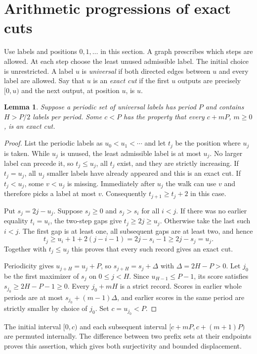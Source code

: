 \documentclass[11pt]{article}
\newtheorem{lemma}[theorem]{Lemma}
\begin{document}
\clearpage
\section{Arithmetic progressions of exact cuts}
Use labels and positions $0,1,\ldots$ in this section. A graph prescribes which steps are allowed. At each step choose the least unused admissible label. The initial choice is unrestricted. A label $u$ is \emph{universal} if both directed edges between $u$ and every label are allowed. Say that $u$ is an \emph{exact cut} if the first $u$ outputs are precisely $[0,u)$ and the next output, at position $u$, is $u$.
\begin{lemma}\label{period}
Suppose a periodic set of universal labels has period $P$ and contains $H>P/2$ labels per period. Some $c<P$ has the property that every $c+mP$, $m\ge0$, is an exact cut.
\end{lemma}
\begin{proof}
List the periodic labels as $u_0<u_1<\cdots$ and let $t_j$ be the position where $u_j$ is taken. While $u_j$ is unused, the least admissible label is at most $u_j$. No larger label can precede it, so $t_j\le u_j$, all $t_j$ exist, and they are strictly increasing. If $t_j=u_j$, all $u_j$ smaller labels have already appeared and this is an exact cut. If $t_j<u_j$, some $v<u_j$ is missing. Immediately after $u_j$ the walk can use $v$ and therefore picks a label at most $v$. Consequently $t_{j+1}\ge t_j+2$ in this case.

Put $s_j=2j-u_j$. Suppose $s_j\ge0$ and $s_j>s_i$ for all $i<j$. If there was no earlier equality $t_i=u_i$, the two-step gaps give $t_j\ge2j\ge u_j$. Otherwise take the last such $i<j$. The first gap is at least one, all subsequent gaps are at least two, and hence
\[
 t_j\ge u_i+1+2(j-i-1)=2j-s_i-1\ge2j-s_j=u_j.
\]
Together with $t_j\le u_j$ this proves that every such record gives an exact cut.

Periodicity gives $u_{j+H}=u_j+P$, so $s_{j+H}=s_j+\Delta$ with $\Delta=2H-P>0$. Let $j_0$ be the first maximizer of $s_j$ on $0\le j<H$. Since $u_{H-1}\le P-1$, its score satisfies $s_{j_0}\ge2H-P-1\ge0$. Every $j_0+mH$ is a strict record. Scores in earlier whole periods are at most $s_{j_0}+(m-1)\Delta$, and earlier scores in the same period are strictly smaller by choice of $j_0$. Set $c=u_{j_0}<P$.
\end{proof}
The initial interval $[0,c)$ and each subsequent interval $[c+mP,c+(m+1)P)$ are permuted internally. The difference between two prefix sets at their endpoints proves this assertion, which gives both surjectivity and bounded displacement.
\end{document}
